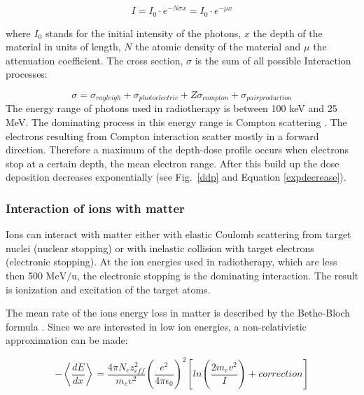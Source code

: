 \begin{equation}
 I = I_{0} \cdot e^{- N \sigma x} = I_{0} \cdot e^{-\mu x}
 \label{expdecrease}
\end{equation} 

where $I_{0}$ stands for the initial intensity of the photons, $x$ the depth of the material in units of length, $N$ the atomic density of the material and $\mu$ the attenuation coefficient. The cross section, $\sigma$ is the sum of all possible Interaction processes:

\begin{equation}
{\sigma} = \sigma_{rayleigh} + \sigma_{photoelectric} + Z\sigma_{compton} + \sigma_{pairproduction} 
\end{equation}
The energy range of photons used in radiotherapy is between 100 keV and 25 MeV. The dominating process in this energy range is Compton scattering \cite{Alpen1998}.
The electrons resulting from Compton interaction scatter mostly in a forward direction. Therefore a maximum of the depth-dose profile occurs when electrons stop at a certain depth, 
the mean electron range. After this build up the dose deposition decreases exponentially (see Fig.~\ref{ddp} and Equation \ref{expdecrease}).

\subsubsection{Interaction of ions with matter}
\label{iion}
Ions can interact with matter either with elastic Coulomb scattering from target nuclei (nuclear stopping) or with inelastic collision with target electrons (electronic stopping).
At the ion energies used in radiotherapy, which are less then 500 $\mathrm{MeV}/\mathrm{u}$, the electronic stopping is the dominating interaction. The result is ionization and excitation of the target atoms.

The mean rate of the ions energy loss in matter is described by the Bethe-Bloch formula \cite{Bethe1930, Bloch1933}. Since we are interested in low ion energies, a non-relativistic approximation can be made:

\begin{equation}
- \left \langle \frac{dE}{dx} \right \rangle = \frac{ 4 \pi N_{e} z_{eff}^{2} }{ m_{e} v^{2} } \left( \frac{e^{2}}{4\pi \epsilon_{0}} \right) ^{2} \left[ln \left( \frac{2m_{e}v^{2}}{I} \right)+correction \right]
 \label{bethe}
\end{equation}



